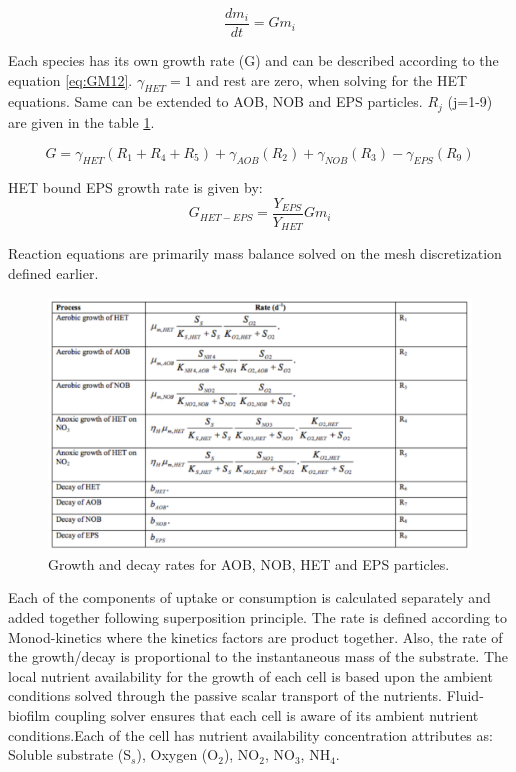 \documentclass[11pt,a4paper,openright]{article}
\begin{document}
\begin{equation}
\label{eq:GM}
\frac{dm_{i}}{dt} = Gm_{i}
\end{equation}

Each species has its own growth rate (G) and can be described according to the equation \ref{eq:GM12}. $\gamma_{HET} = 1$ and rest are zero, when solving for the HET equations. Same can be extended to AOB, NOB and EPS particles. $R_{j}$ (j=1-9) are given in the table \ref{fig:gdrates}.

\begin{equation}
\label{eq:GM12}
G = \gamma_{HET}\left ( R_1 + R_4 + R_5 \right )+\gamma_{AOB}\left ( R_2 \right ) + \gamma_{NOB}\left ( R_3\right ) -\gamma_{EPS}\left ( R_9\right )
\end{equation}

HET bound EPS growth rate is given by:
\begin{equation}
\label{eq:GMEPS}
G_{HET-EPS} = \frac{Y_{EPS}}{Y_{HET}} G m_{i}
\end{equation}

Reaction equations are primarily mass balance solved on the mesh discretization defined earlier. 

\begin{figure}[H]
\begin{center}
  \includegraphics[width=0.9\columnwidth]{Figs/Tableforrates.pdf}
\caption{Growth and decay rates for AOB, NOB, HET and EPS particles.}
\label{fig:gdrates}       %
\end{center}
\end{figure}  


Each of the components of uptake or consumption is calculated separately and added together following superposition principle. The rate is defined according to Monod-kinetics where the kinetics factors are product together. Also, the rate of the growth/decay is proportional to the instantaneous mass of the substrate. The local nutrient availability for the growth of each cell is based upon the ambient conditions solved through the passive scalar transport of the nutrients. Fluid-biofilm coupling solver ensures that each cell is aware of its ambient nutrient conditions.Each of the cell has nutrient availability concentration attributes as: Soluble substrate (S$_s$), Oxygen (O$_2$), NO$_2$, NO$_3$, NH$_4$. 
\end{document}
